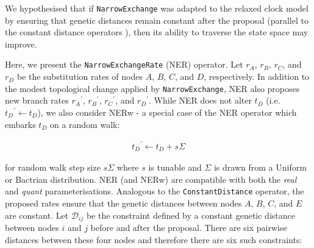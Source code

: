 \documentclass[10pt,letterpaper]{article}
\begin{document}
We hypothesised that if \texttt{NarrowExchange} was adapted to the relaxed clock model by ensuring that genetic distances remain constant after the proposal (parallel to the constant distance operators \cite{zhang2020improving}), then its ability to traverse the state space may improve. 




Here, we present the \texttt{NarrowExchangeRate} (NER) operator. 
Let $r_A$, $r_B$, $r_C$, and $r_D$ be the substitution rates of nodes $A$, $B$, $C$, and $D$, respectively. 
In addition to the modest topological change applied by \texttt{NarrowExchange}, NER also proposes new branch rates ${r_A}^\prime$, ${r_B}^\prime$, ${r_C}^\prime$, and ${r_D}^\prime$. While NER does not alter $t_D$ (i.e. ${t_D}^\prime \leftarrow t_D$), we also consider NERw - a special case of the NER operator which embarks $t_D$ on a random walk:

\begin{align}
	{t_D}^\prime \leftarrow t_D + s\Sigma
\end{align}

for random walk step size $s\Sigma$ where $s$ is tunable and $\Sigma$ is drawn from a Uniform or Bactrian distribution. NER (and NERw) are compatible with both the \textit{real} and \textit{quant} parameterisations. 
Analogous to the \texttt{ConstantDistance} operator, the proposed rates ensure that the genetic distances between nodes $A$, $B$, $C$, and $E$ are constant. 
Let $\mathcal{D}_{ij}$ be the constraint defined by a constant genetic distance between nodes $i$ and $j$ before and after the proposal.
There are six pairwise distances between these four nodes and therefore there are six such constraints:
\end{document}
